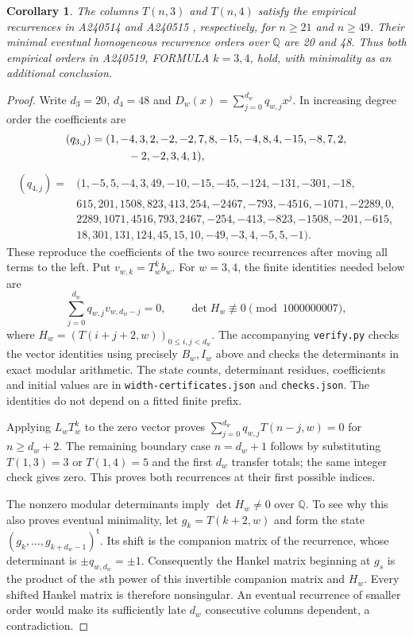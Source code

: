 \documentclass[11pt]{article}
\newtheorem{corollary}{Corollary}
\begin{document}
\begin{corollary}\label{cor:orders}
The columns $T(n,3)$ and $T(n,4)$ satisfy the empirical recurrences in
A240514 and A240515 \cite{wider}, respectively, for $n\geq21$ and $n\geq49$.
Their minimal eventual homogeneous recurrence orders over $\mathbb Q$
are 20 and 48. Thus both empirical orders in A240519, FORMULA $k=3,4$,
hold, with minimality as an additional conclusion.
\end{corollary}
\begin{proof}
Write $d_3=20$, $d_4=48$ and
$D_w(x)=\sum_{j=0}^{d_w}q_{w,j}x^j$.
In increasing degree order the coefficients are
\[
\begin{split}
(q_{3,j})={}&(1,-4,3,2,-2,-2,7,8,-15,-4,8,4,-15,-8,7,2,\\
           &\hspace{7mm}-2,-2,3,4,1),
\end{split}
\]
\[
\begin{split}
(q_{4,j})={}&(1,-5,5,-4,3,49,-10,-15,-45,-124,-131,-301,-18,\\
 &615,201,1508,823,413,254,-2467,-793,-4516,-1071,-2289,0,\\
 &2289,1071,4516,793,2467,-254,-413,-823,-1508,-201,-615,\\
 &18,301,131,124,45,15,10,-49,-3,4,-5,5,-1).
\end{split}
\]
These reproduce the coefficients of the two source recurrences after
moving all terms to the left. Put $v_{w,k}=T_w^k b_w$.
For $w=3,4$, the finite identities needed below are
\[
 \sum_{j=0}^{d_w}q_{w,j}v_{w,d_w-j}=0,
 \qquad \det H_w\not\equiv0\pmod {1000000007},
\]
where $H_w=(T(i+j+2,w))_{0\leq i,j<d_w}$.
The accompanying \texttt{verify.py} checks the vector identities using
precisely $B_w,I_w$ above and checks the determinants in exact modular
arithmetic. The state counts, determinant residues, coefficients and
initial values are in \texttt{width-certificates.json} and
\texttt{checks.json}. The identities do not depend on a fitted finite
prefix.

Applying $L_wT_w^k$ to the zero vector proves
$\sum_{j=0}^{d_w}q_{w,j}T(n-j,w)=0$ for $n\geq d_w+2$.
The remaining boundary case $n=d_w+1$ follows by substituting
$T(1,3)=3$ or $T(1,4)=5$ and the first $d_w$ transfer totals; the
same integer check gives zero. This proves both recurrences at their
first possible indices.

The nonzero modular determinants imply $\det H_w\ne0$ over
$\mathbb Q$. To see why this also proves eventual minimality,
let $g_k=T(k+2,w)$ and form the state
$(g_k,\ldots,g_{k+d_w-1})^{\mathsf t}$. Its shift is the companion
matrix of the recurrence, whose determinant is $\pm q_{w,d_w}=\pm1$.
Consequently the Hankel matrix beginning at $g_s$ is the product of
the $s$th power of this invertible companion matrix and $H_w$.
Every shifted Hankel matrix is therefore nonsingular. An eventual
recurrence of smaller order would make its sufficiently late $d_w$
consecutive columns dependent, a contradiction.
\end{proof}
\end{document}
